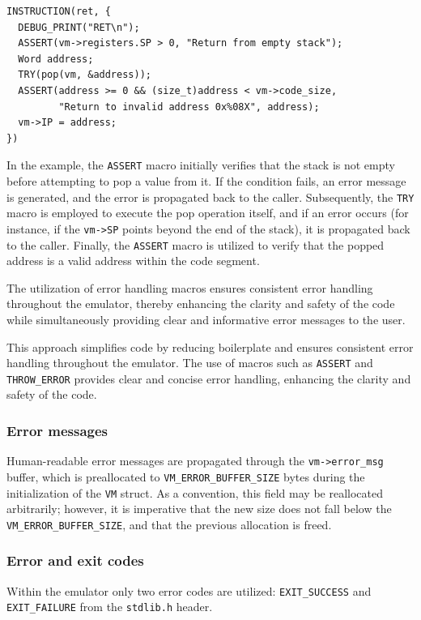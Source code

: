 \documentclass[10pt,a4paper,final]{article}
\newcommand{\code}[1]{\texttt{#1}}
\begin{document}
\begin{verbatim}
INSTRUCTION(ret, {
  DEBUG_PRINT("RET\n");
  ASSERT(vm->registers.SP > 0, "Return from empty stack");
  Word address;
  TRY(pop(vm, &address));
  ASSERT(address >= 0 && (size_t)address < vm->code_size,
         "Return to invalid address 0x%08X", address);
  vm->IP = address;
})
\end{verbatim}

In the example, the \code{ASSERT} macro initially verifies that the stack is not
empty before attempting to pop a value from it. If the condition fails, an error
message is generated, and the error is propagated back to the caller.
Subsequently, the \code{TRY} macro is employed to execute the pop operation
itself, and if an error occurs (for instance, if the \code{vm->SP} points beyond
the end of the stack), it is propagated back to the caller. Finally, the
\code{ASSERT} macro is utilized to verify that the popped address is a valid
address within the code segment.

The utilization of error handling macros ensures consistent error handling
throughout the emulator, thereby enhancing the clarity and safety of the code
while simultaneously providing clear and informative error messages to the user.

This approach simplifies code by reducing boilerplate and ensures consistent
error handling throughout the emulator. The use of macros such as \code{ASSERT}
and \code{THROW_ERROR} provides clear and concise error handling, enhancing the
clarity and safety of the code.

\subsubsection{Error messages}
\label{sec:errormessages}

Human-readable error messages are propagated through the \code{vm->error_msg}
buffer, which is preallocated to \code{VM_ERROR_BUFFER_SIZE} bytes during the
initialization of the \code{VM} struct. As a convention, this field may be
reallocated arbitrarily; however, it is imperative that the new size does not
fall below the \code{VM_ERROR_BUFFER_SIZE}, and that the previous allocation is
freed.

\subsubsection{Error and exit codes}
\label{sec:errorcodes}

Within the emulator only two error codes are utilized: \code{EXIT_SUCCESS} and
\code{EXIT_FAILURE} from the \code{stdlib.h} header.
\end{document}
